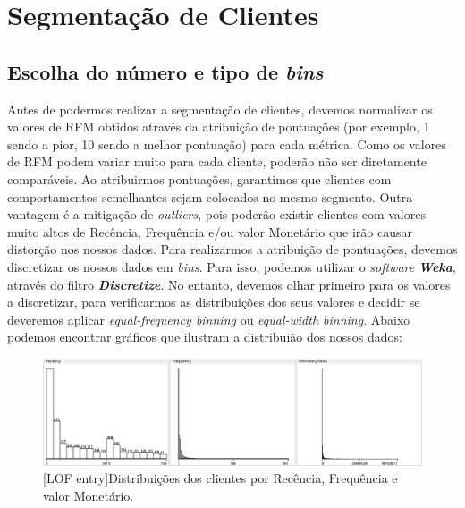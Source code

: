 \documentclass{easychair}
\begin{document}


\section{Segmentação de Clientes}
\subsection{Escolha do número e tipo de \textit{bins}}

Antes de podermos realizar a segmentação de clientes, devemos normalizar os valores de RFM obtidos através da atribuição de pontuações (por exemplo, 1 sendo a pior, 10 sendo a melhor pontuação) para cada métrica. Como os valores de RFM podem variar muito para cada cliente, poderão não ser diretamente comparáveis. Ao atribuirmos pontuações, garantimos que clientes com comportamentos semelhantes sejam colocados no mesmo segmento. Outra vantagem é a mitigação de \textit{outliers}, pois poderão existir clientes com valores muito altos de Recência, Frequência e/ou valor Monetário que irão causar distorção nos nossos dados.
Para realizarmos a atribuição de pontuações, devemos discretizar os nossos dados em \textit{bins}. Para isso, podemos utilizar o \textit{software} \textit{\textbf{Weka}}, através do filtro \textit{\textbf{Discretize}}. No entanto, devemos olhar primeiro para os valores a discretizar, para verificarmos as distribuições dos seus valores e decidir se deveremos aplicar \textit{equal-frequency binning} ou \textit{equal-width binning}. Abaixo podemos encontrar gráficos que ilustram a distribuião dos nossos dados:

 \begin{figure}[H]
    \begin{centering}
    \includegraphics[width=1\linewidth]{imagens/figure6.jpg}\label{cap-3-fig6}
    [LOF entry]{Distribuições dos clientes por Recência, Frequência e valor Monetário.}
    \label{fig6}
    \end{centering}
\end{figure}
\end{document}
